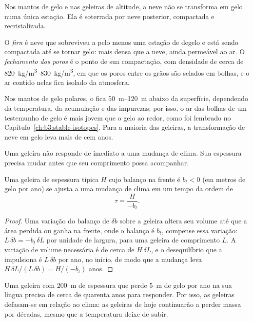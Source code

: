 Nos mantos de gelo e nas geleiras de altitude, a neve não se transforma em gelo
numa única estação. Ela é soterrada por neve posterior, compactada e recristalizada.

\begin{definition}\label{def:b3:glaciology:firn}
O \emph{firn} é neve que sobreviveu a pelo menos uma estação de degelo
e está sendo compactada até se tornar gelo: mais densa que a neve, ainda permeável ao ar.
O \emph{fechamento dos poros} é o ponto de sua
compactação, com densidade de cerca de \qtyrange{820}{830}{kg/m^3}, em que os
poros entre os grãos são selados em bolhas, e o ar contido nelas fica
isolado da atmosfera.
\end{definition}

Nos mantos de gelo polares, o  fica \qtyrange{50}{120}{m} abaixo da
superfície, dependendo da temperatura, da acumulação e das
impurezas; por isso, o ar das bolhas de um testemunho de gelo é mais jovem que o
gelo ao redor, como foi lembrado no Capítulo~\ref{ch:b3:stable-isotopes}. Para a maioria
das geleiras, a transformação de neve em gelo leva mais de cem anos.

Uma geleira não responde de imediato a uma mudança de clima. Sua espessura
precisa mudar antes que seu comprimento possa acompanhar.

\begin{proposition}\label{prop:b3:glaciology:response}
Uma geleira de espessura típica $H$ cujo balanço na frente é $b_t <
0$ (em metros de gelo por ano) se ajusta a uma mudança de clima em um tempo da
ordem de
\[
\tau = \frac{H}{-b_t} .
\]
\end{proposition}

\begin{proof}
Uma variação do balanço de $\delta b$ sobre a geleira altera seu volume
até que a área perdida ou ganha na frente, onde o balanço é $b_t$,
compense essa variação: $L\,\delta b = -b_t\,\delta L$ por unidade de largura, para uma
geleira de comprimento $L$. A variação de volume necessária é de cerca de $H\,\delta L$, e
o desequilíbrio que a impulsiona é $L\,\delta b$ por ano, no início, de modo que a
mudança leva $H\,\delta L/(L\,\delta b) = H/(-b_t)$ anos.
\end{proof}

Uma geleira com \qty{200}{m} de espessura que perde \qty{5}{m} de gelo por ano na sua
língua precisa de cerca de quarenta anos para responder. Por isso, as geleiras defasam-se em relação ao
clima: as geleiras de hoje continuarão a perder massa por décadas, mesmo que a
temperatura deixe de subir.

